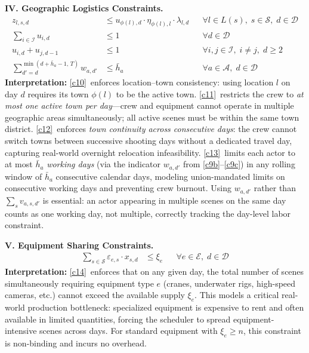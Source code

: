 \medskip
\noindent\textbf{IV. Geographic Logistics Constraints.}
\vspace{-4pt}
\begin{align}
z_{l,s,d} &\leq u_{\phi(l),d} \cdot \eta_{\phi(l),l} \cdot \lambda_{l,d} && \forall l \in L(s),\; s \in \mathcal{S},\; d \in \mathcal{D} \tag{C10}\label{c10}\\
\sum_{i \in \mathcal{I}} u_{i,d} &\leq 1 && \forall d \in \mathcal{D} \tag{C11}\label{c11}\\
u_{i,d} + u_{j,d-1} &\leq 1 && \forall i, j \in \mathcal{I},\; i \neq j,\; d \geq 2 \tag{C12}\label{c12}\\
\sum_{d'=d}^{\min(d + \bar{h}_a - 1,\, T)} w_{a,d'} &\leq \bar{h}_a && \forall a \in \mathcal{A},\; d \in \mathcal{D} \tag{C13}\label{c13}
\end{align}
\textbf{Interpretation:}
\ref{c10}~enforces location--town consistency: using location $l$ on day $d$ requires its town $\phi(l)$ to be the active town.
\ref{c11}~restricts the crew to \emph{at most one active town per day}---crew and equipment cannot operate in multiple geographic areas simultaneously; all active scenes must be within the same town district.
\ref{c12}~enforces \emph{town continuity across consecutive days}: the crew cannot switch towns between successive shooting days without a dedicated travel day, capturing real-world overnight relocation infeasibility.
\ref{c13}~limits each actor to at most $\bar{h}_a$ \emph{working days} (via the indicator $w_{a,d'}$ from \ref{c9b}--\ref{c9c}) in any rolling window of $\bar{h}_a$ consecutive calendar days, modeling union-mandated limits on consecutive working days and preventing crew burnout.
Using $w_{a,d'}$ rather than $\sum_s v_{a,s,d'}$ is essential: an actor appearing in multiple scenes on the same day counts as one working day, not multiple, correctly tracking the day-level labor constraint.

\medskip
\noindent\textbf{V. Equipment Sharing Constraints.}
\vspace{-4pt}
\begin{align}
\sum_{s \in \mathcal{S}} \varepsilon_{e,s} \cdot x_{s,d} &\leq \xi_e && \forall e \in \mathcal{E},\; d \in \mathcal{D} \tag{C14}\label{c14}
\end{align}
\textbf{Interpretation:}
\ref{c14}~enforces that on any given day, the total number of scenes simultaneously requiring equipment type $e$ (cranes, underwater rigs, high-speed cameras, etc.) cannot exceed the available supply $\xi_e$.
This models a critical real-world production bottleneck: specialized equipment is expensive to rent and often available in limited quantities, forcing the scheduler to spread equipment-intensive scenes across days.
For standard equipment with $\xi_e \geq n$, this constraint is non-binding and incurs no overhead.

